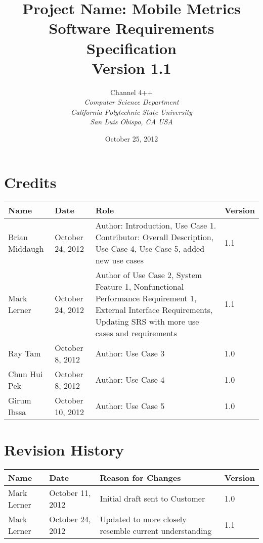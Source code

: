 \documentclass[12pt,oneside,letterpaper]{article}
\begin{document}
\title{\bfseries Project Name: Mobile Metrics\\
Software Requirements Specification\\
Version 1.1}

\author {
\large{Channel 4++}\\
\emph{Computer Science Department}\\
\emph{California Polytechnic State University}\\
\emph{San Luis Obispo, CA USA}\\
}

\date{October 25, 2012}
\maketitle \thispagestyle{empty}


\pagebreak
\tableofcontents


\newpage
\section*{Credits}
\begin{tabular}{|l|l|p{2.5in}|l|}
\hline
\textbf{Name}&\textbf{Date}&\textbf{Role}&\textbf{Version}\\
\hline
Brian Middaugh&October 24, 2012&Author: Introduction, Use Case 1. Contributor: Overall Description, Use Case 4, Use Case 5, added new use cases&1.1\\
\hline
Mark Lerner&October 24, 2012&Author of Use Case 2, System Feature 1, Nonfunctional Performance Requirement 1, External Interface Requirements, Updating SRS with more use cases and requirements&1.1\\
\hline
Ray Tam&October 8, 2012& Author: Use Case 3&1.0\\
\hline
Chun Hui Pek&October 8, 2012&Author: Use Case 4&1.0\\
\hline
Girum Ibssa&October 10, 2012&Author: Use Case 5&1.0\\
\hline
\end{tabular}

\section*{Revision History}
\begin{tabular}{|l|l|p{2.5in}|l|}
\hline
\textbf{Name}&\textbf{Date}&\textbf{Reason for Changes}&\textbf{Version}\\
\hline
Mark Lerner&October 11, 2012&Initial draft sent to Customer&1.0\\
\hline
Mark Lerner&October 24, 2012&Updated to more closely resemble current understanding&1.1\\
\hline
\end{tabular}
\end{document}
